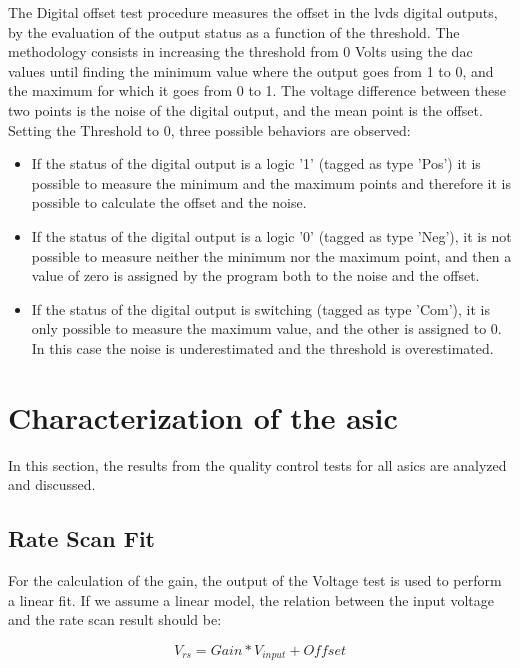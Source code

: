 \documentclass[main.tex]{subfiles}
\begin{document}
The Digital offset test procedure measures the offset in the \gls{lvds} digital outputs, by the evaluation of the output status as a function of the threshold. The methodology consists in increasing the threshold from 0 Volts using the \gls{dac} values until finding the minimum value where the output goes from 1 to 0, and the maximum for which it goes from 0 to 1. The voltage difference between these two points is the noise of the digital output, and the mean point is the offset. Setting the Threshold to 0, three possible behaviors are observed:
\begin{itemize}
\item If the status of the digital output is a logic '1' (tagged as type 'Pos') it is possible to measure the minimum and the maximum points and therefore it is possible to calculate the offset and the noise.
\item If the status of the digital output is a logic '0' (tagged as type 'Neg'), it is not possible to measure neither the minimum nor the maximum point, and then a value of zero is assigned by the program both to the noise and the offset.
\item If the status of the digital output is switching (tagged as type 'Com'), it is only possible to measure the maximum value, and the other is assigned to 0. In this case the noise is underestimated and the threshold is overestimated.
\end{itemize}

\section{Characterization of the \gls{asic}}

In this section, the results from the quality control tests for all \glspl{asic} are analyzed and discussed.

\subsection{Rate Scan Fit}

For the calculation of the gain, the output of the Voltage test is used to perform a linear fit. If we assume a linear model, the relation between the input voltage and the rate scan result should be:

\begin{equation}
  \label{eq:fit}
  V_{rs} = Gain*V_{input} + Offset
\end{equation}
\end{document}
